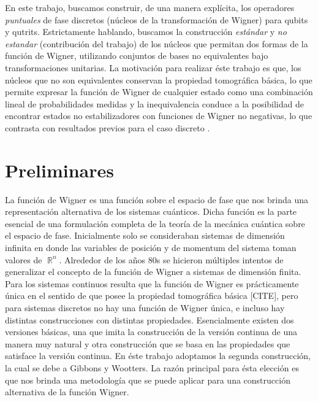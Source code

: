 \documentclass[a4paper]{report}
\DeclareMathOperator{\R}{\mathbb{R}}
\begin{document}
  En este trabajo, buscamos construir, de una manera
  explícita, los operadores \textit{puntuales} de fase
  discretos (núcleos de la transformación de Wigner) para
  qubits y qutrits. Estrictamente hablando, buscamos la
  construcción \textit{estándar}
  \cite{woottersWignerFunctionFormulationFiniteState1987} y
  \textit{no estandar} (contribución del trabajo) de los
  núcleos que permitan dos formas de la función de Wigner,
  utilizando conjuntos de bases no equivalentes bajo
  transformaciones unitarias. La motivación para realizar
  éste trabajo es que, los núcleos que no son equivalentes
  conservan la propiedad tomográfica básica, lo que permite
  expresar la función de Wigner de cualquier estado como una
  combinación lineal de probabilidades medidas y la
  inequivalencia conduce a la posibilidad de encontrar
  estados no estabilizadores con funciones de Wigner no
  negativas, lo que contrasta con resultados previos para el
  caso discreto
  \cite{grossHudsonTheoremFinitedimensional2006,
  galvaoDiscreteWignerFunctions2005,
  cormickInterferenceDiscreteWigner2006}.

  \chapter{Preliminares}

  La función de Wigner es una función sobre el espacio de
  fase que nos brinda una representación alternativa de los
  sistemas cuánticos. Dicha función es la parte esencial de
  una formulación completa de la teoría de la mecánica
  cuántica sobre el espacio de fase. Inicialmente solo se
  consideraban sistemas de dimensión infinita en donde las
  variables de posición y de momentum del sistema toman
  valores de $\R^{n}$. Alrededor de los años 80s se hicieron
  múltiples intentos de generalizar el concepto de la
  función de Wigner a sistemas de dimensión finita. Para los
  sistemas continuos resulta que la función de Wigner es
  prácticamente única en el sentido de que posee la
  propiedad tomográfica básica [CITE], pero para sistemas
  discretos no hay una función de Wigner única, e incluso
  hay distintas construcciones con distintas propiedades.
  Esencialmente existen dos versiones básicas, una que imita
  la construcción de la versión continua de una manera muy
  natural y otra construcción que se basa en las propiedades
  que satisface la versión continua. En éste trabajo
  adoptamos la segunda construcción, la cual se debe a
  Gibbons y Wootters. La razón principal para ésta elección
  es que nos brinda una metodología que se puede aplicar
  para una construcción alternativa de la función Wigner.
\end{document}
